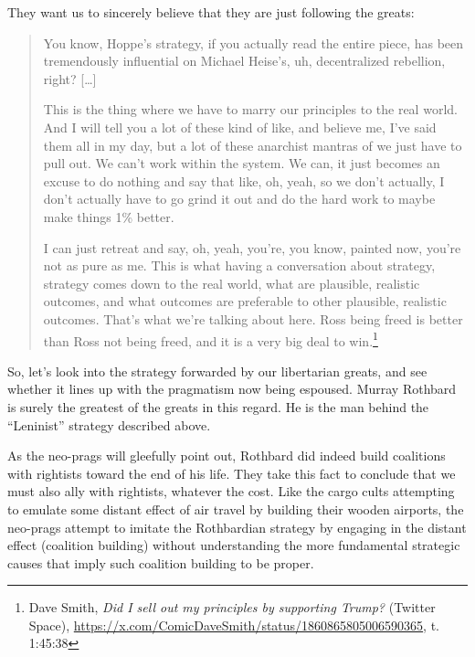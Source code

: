 \documentclass[11pt]{article}
\begin{document}
They want us to sincerely believe that they are just following the greats:
\begin{quote}
You know, Hoppe's strategy, if you actually read the entire piece, has been tremendously influential on Michael Heise's, uh, decentralized rebellion, right? [\ldots{}]

This is the thing where we have to marry our principles to the real world. And I will tell you a lot of these kind of like, and believe me, I've said them all in my day, but a lot of these anarchist mantras of we just have to pull out. We can't work within the system. We can, it just becomes an excuse to do nothing and say that like, oh, yeah, so we don't actually, I don't actually have to go grind it out and do the hard work to maybe make things 1\% better.

I can just retreat and say, oh, yeah, you're, you know, painted now, you're not as pure as me. This is what having a conversation about strategy, strategy comes down to the real world, what are plausible, realistic outcomes, and what outcomes are preferable to other plausible, realistic outcomes. That's what we're talking about here. Ross being freed is better than Ross not being freed, and it is a very big deal to win.\footnote{Dave Smith, \emph{Did I sell out my principles by supporting Trump?} (Twitter Space), \url{https://x.com/ComicDaveSmith/status/1860865805006590365}, t. 1:45:38}
\end{quote}

So, let's look into the strategy forwarded by our libertarian greats, and see whether it lines up with the pragmatism now being espoused. Murray Rothbard is surely the greatest of the greats in this regard. He is the man behind the ``Leninist'' strategy described above.

As the neo-prags will gleefully point out, Rothbard did indeed build coalitions with rightists toward the end of his life. They take this fact to conclude that we must also ally with rightists, whatever the cost. Like the cargo cults attempting to emulate some distant effect of air travel by building their wooden airports, the neo-prags attempt to imitate the Rothbardian strategy by engaging in the distant effect (coalition building) without understanding the more fundamental strategic causes that imply such coalition building to be proper.
\end{document}

